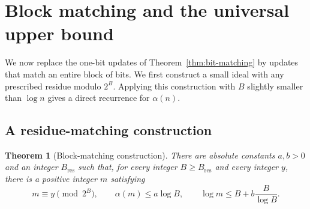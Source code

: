 \documentclass[11pt]{article}
\newtheorem{theorem}{Theorem}[section]
\theoremstyle{definition}
\theoremstyle{remark}
\begin{document}
\section{Block matching and the universal upper bound}
\label{sec:universal-upper}

We now replace the one-bit updates of
Theorem~\ref{thm:bit-matching} by updates that match an entire block of
bits.  We first construct a small ideal with any prescribed residue
modulo $2^B$.  Applying this construction with $B$ slightly smaller than
$\log n$ gives a direct recurrence for $\alpha(n)$.

\subsection{A residue-matching construction}

\begin{theorem}[Block-matching construction]\label{thm:block-matching}
There are absolute constants $a,b>0$ and an integer $B_{\mathrm{res}}$ such that, for
every integer $B\ge B_{\mathrm{res}}$ and every integer $y$, there is a positive integer
$m$ satisfying
\[
  m\equiv y\pmod{2^B},
  \qquad
  \alpha(m)\le a\log B,
  \qquad
  \log m\le B+b\frac{B}{\log B}.
\]
\end{theorem}
\end{document}
